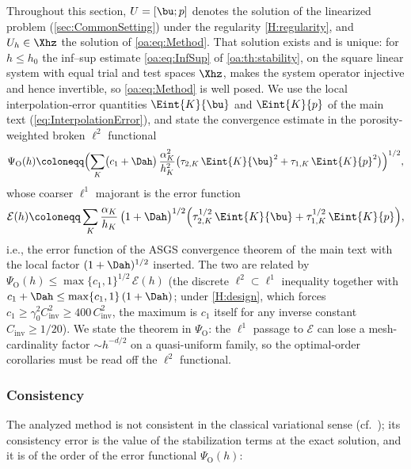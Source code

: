 Throughout this section, $U = [\bu; p]$ denotes the solution of
the linearized problem (\cref{sec:CommonSetting}) under the regularity \cref{H:regularity}, and $U_h \in \Xhz$ the solution of
\cref{oa:eq:Method}. That solution exists and is unique: for $h \le h_0$ the inf--sup estimate
\cref{oa:eq:InfSup} of \cref{oa:th:stability}, on the square linear system with equal trial and
test spaces $\Xhz$, makes the system operator injective and hence invertible, so
\cref{oa:eq:Method} is well posed. We use the local interpolation{\hyp}error quantities
$\Eint{K}{\bu}$ and $\Eint{K}{p}$ of the main text (\cref{eq:InterpolationError}), and state
the convergence estimate in the porosity-weighted broken $\ell^2$ functional
\begin{equation}
  \label{oa:eq:ErrorFunctionL2}
  \Psi_{\mathrm O}(h)
  \coloneqq
  \Bigl( \sum_K \bigl( c_1 + \Dah \bigr)\,\frac{\alpha_K^2}{h_K^2}
  \bigl( \tau_{2,K}\,\Eint{K}{\bu}^2 + \tau_{1,K}\,\Eint{K}{p}^2 \bigr) \Bigr)^{1/2},
\end{equation}
whose coarser $\ell^1$ majorant is the error function
\begin{equation}
  \label{oa:eq:ErrorFunction}
  \mathcal{E}(h)
  \coloneqq
  \sum_K \frac{\alpha_K}{h_K}\,\bigl(1 + \Dah\bigr)^{1/2}
  \Bigl( \tau_{2,K}^{1/2}\,\Eint{K}{\bu} + \tau_{1,K}^{1/2}\,\Eint{K}{p} \Bigr),
\end{equation}
i.e., the error function of the ASGS convergence theorem of~the main text with the
local factor $(1+\Dah)^{1/2}$ inserted. The two are related by
$\Psi_{\mathrm O}(h) \le \max\{c_1,1\}^{1/2}\,\mathcal{E}(h)$ (the discrete $\ell^2\subset\ell^1$
inequality together with $c_1+\Dah \le \max\{c_1,1\}\,(1+\Dah)$; under \cref{H:design}, which forces $c_1\ge\gamma_0^2C_{\mathrm{inv}}^2\ge400\,C_{\mathrm{inv}}^2$, the maximum is $c_1$ itself for any inverse constant $C_{\mathrm{inv}}\ge1/20$). We state the theorem in
$\Psi_{\mathrm O}$: the $\ell^1$ passage to $\mathcal{E}$ can lose a mesh-cardinality
factor $\sim h^{-d/2}$ on a quasi-uniform family, so the optimal-order corollaries
must be read off the $\ell^2$ functional.

\subsubsection{Consistency}

The analyzed method is not consistent in the classical variational sense
(cf.~\cite[Eq.~(44)]{codina2008analysis}); its consistency error is the value of the
stabilization terms at the exact solution, and it is of the order of the error
functional $\Psi_{\mathrm O}(h)$:


